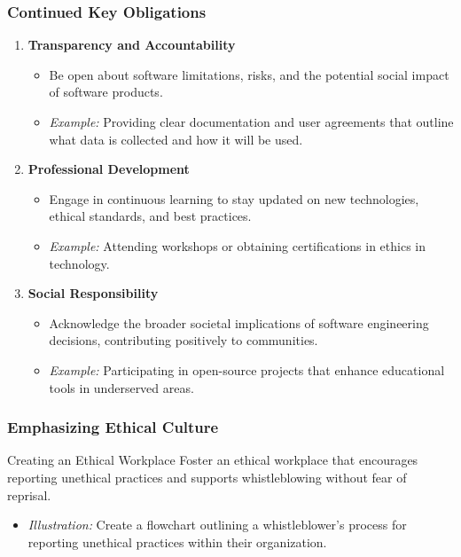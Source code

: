 \documentclass{beamer}
\begin{document}
\begin{frame}[fragile]
    \frametitle{Continued Key Obligations}
    \begin{enumerate}[resume]
        \item \textbf{Transparency and Accountability}
            \begin{itemize}
                \item Be open about software limitations, risks, and the potential social impact of software products.
                \item \textit{Example:} Providing clear documentation and user agreements that outline what data is collected and how it will be used.
            \end{itemize}

        \item \textbf{Professional Development}
            \begin{itemize}
                \item Engage in continuous learning to stay updated on new technologies, ethical standards, and best practices.
                \item \textit{Example:} Attending workshops or obtaining certifications in ethics in technology.
            \end{itemize}

        \item \textbf{Social Responsibility}
            \begin{itemize}
                \item Acknowledge the broader societal implications of software engineering decisions, contributing positively to communities.
                \item \textit{Example:} Participating in open-source projects that enhance educational tools in underserved areas.
            \end{itemize}
    \end{enumerate}
\end{frame}

\begin{frame}[fragile]
    \frametitle{Emphasizing Ethical Culture}
    \begin{block}{Creating an Ethical Workplace}
        Foster an ethical workplace that encourages reporting unethical practices and supports whistleblowing without fear of reprisal.
        \begin{itemize}
            \item \textit{Illustration:} Create a flowchart outlining a whistleblower's process for reporting unethical practices within their organization.
        \end{itemize}
    \end{block}
\end{frame}
\end{document}

